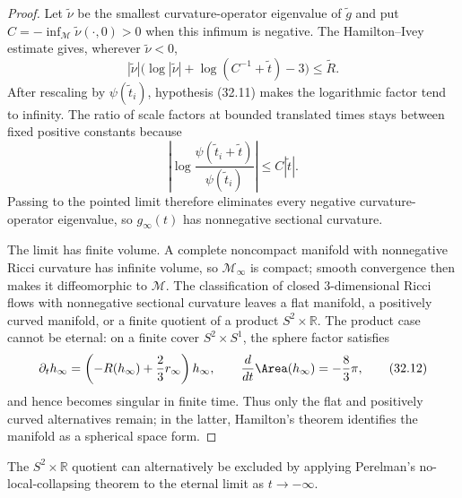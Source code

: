 \begin{proof}
\sketch
Let $\widetilde\nu$ be the smallest curvature-operator eigenvalue of
$\widetilde g$ and put
$C=-\inf_{\mathcal M}\widetilde\nu(\cdot,0)>0$ when this infimum is
negative.  The Hamilton--Ivey estimate gives, wherever
$\widetilde\nu<0$,
\[
 |\widetilde\nu|
 \bigl(\log|\widetilde\nu|+\log(C^{-1}+\widetilde t)-3\bigr)
 \le\widetilde R.
\]
After rescaling by $\psi(\widetilde t_i)$, hypothesis (32.11) makes the
logarithmic factor tend to infinity.  The ratio of scale factors at bounded
translated times stays between fixed positive constants because
\[
 \left|\log\frac{\psi(\widetilde t_i+\widetilde t)}
 {\psi(\widetilde t_i)}\right|
 \le C|\widetilde t|.
\]
Passing to the pointed limit therefore eliminates every negative
curvature-operator eigenvalue, so $g_\infty(t)$ has nonnegative sectional
curvature.

The limit has finite volume.  A complete noncompact manifold with
nonnegative Ricci curvature has infinite volume, so $\mathcal M_\infty$ is
compact; smooth convergence then makes it diffeomorphic to $\mathcal M$.
The classification of closed $3$-dimensional Ricci flows with nonnegative
sectional curvature leaves a flat manifold, a positively curved manifold,
or a finite quotient of a product $S^2\times\mathbb R$.  The product case
cannot be eternal: on a finite cover $S^2\times S^1$, the sphere factor
satisfies
\[
 \partial_th_\infty
 =\left(-R(h_\infty)+\frac23r_\infty\right)h_\infty,
 \qquad
 \frac d{dt}\Area(h_\infty)=-\frac83\pi,
 \tag{32.12}
\]
and hence becomes singular in finite time.  Thus only the flat and
positively curved alternatives remain; in the latter, Hamilton's theorem
identifies the manifold as a spherical space form.
\end{proof}

\begin{remark}
\label{rem:chow-iv-exclude-sphere-line-product}
The $S^2\times\mathbb R$ quotient can alternatively be excluded by applying
Perelman's no-local-collapsing theorem to the eternal limit as
$t\to-\infty$.
\end{remark}


